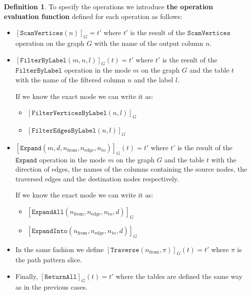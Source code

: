 \documentclass[14pt]{constructor-thesis}
\theoremstyle{definition}
\newtheorem*{definition}{Definition}
\begin{document}
\begin{definition}
  To specify the operations we introduce \textbf{the operation evaluation function} defined for each operation as follows:
  \begin{itemize}
    \item $ [\texttt{ScanVertices}(n)]_G = t'$ where $t'$ is the result of the $\texttt{ScanVertices}$ operation on the graph $G$ with the name of the output column $n$.
    \item $ [\texttt{FilterByLabel}(m, n, l)]_G (t) = t' $ where $t'$ is the result of the \\ $\texttt{FilterByLabel}$ operation in the mode $m$ on the graph $G$ and the table $t$ with the name of the filtered column $n$ and the label $l$. 
    
    If we know the exact mode we can write it as:
    \begin{itemize}
      \item $[\texttt{FilterVerticesByLabel}(n, l)]_G$
      \item $[\texttt{FilterEdgesByLabel}(n, l)]_G$
    \end{itemize}

    \item $ [\texttt{Expand}(m, d, n_{\mathrm{from}}, n_{\mathrm{edge}}, n_{\mathrm{to}})]_G (t) = t' $ where $t'$ is the result of the $\texttt{Expand}$ operation in the mode $m$ on the graph $G$ and the table $t$ with the direction of edges, the names of the columns containing the source nodes, the traversed edges and the destination nodes respectively.
    
    If we know the exact mode we can write it as:
    \begin{itemize}
      \item $[\texttt{ExpandAll}(n_{\mathrm{from}}, n_{\mathrm{edge}}, n_{\mathrm{to}}, d)]_G$
      \item $[\texttt{ExpandInto}(n_{\mathrm{from}}, n_{\mathrm{edge}}, n_{\mathrm{to}}, d)]_G$
    \end{itemize}

    \item In the same fashion we define $[\texttt{Traverse}(n_{\mathrm{from}}, \pi)]_G(t) = t'$ where $\pi$ is the path pattern slice.
    
    \item Finally, $[\texttt{ReturnAll}]_G(t) = t'$ where the tables are defined the same way as in the previous cases.
  \end{itemize}
\end{definition}
\end{document}
